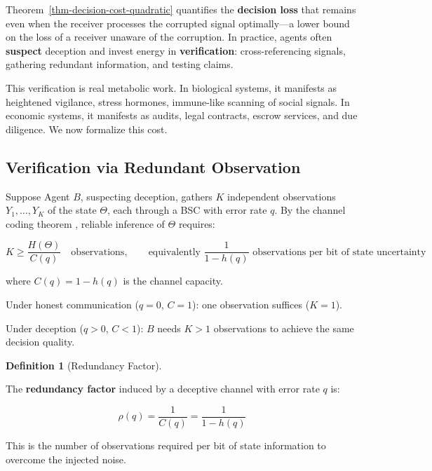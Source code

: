 \documentclass[11pt]{article}
\theoremstyle{plain}
\theoremstyle{definition}
\newtheorem{definition}{Definition}
\theoremstyle{remark}
\let\origsubsection\subsection
\renewcommand{\subsection}{\needspace{7\baselineskip}\origsubsection}
\begin{document}
Theorem~\ref{thm-decision-cost-quadratic} quantifies the
\textbf{decision loss} that remains even when the receiver processes the
corrupted signal optimally---a lower bound on the loss of a receiver
unaware of the corruption. In practice, agents often \textbf{suspect}
deception and invest energy in \textbf{verification}: cross-referencing
signals, gathering redundant information, and testing claims.

This verification is real metabolic work. In biological systems, it
manifests as heightened vigilance, stress hormones, immune-like scanning
of social signals. In economic systems, it manifests as audits, legal
contracts, escrow services, and due diligence. We now formalize this
cost.

\subsection{Verification via Redundant
Observation}\label{verification-via-redundant-observation}

Suppose Agent \(B\), suspecting deception, gathers \(K\) independent
observations \(Y_1, \ldots, Y_K\) of the state \(\Theta\), each through
a BSC with error rate \(q\). By the channel coding theorem
\citep{Shannon1948}, reliable inference of \(\Theta\) requires:

\[K \geq \frac{H(\Theta)}{C(q)} \quad \text{observations}, \qquad \text{equivalently } \frac{1}{1 - h(q)} \text{ observations per bit of state uncertainty}\]

where \(C(q) = 1 - h(q)\) is the channel capacity.

Under honest communication (\(q = 0\), \(C = 1\)): one observation
suffices (\(K = 1\)).

Under deception (\(q > 0\), \(C < 1\)): \(B\) needs \(K > 1\)
observations to achieve the same decision quality.

\begin{definition}[Redundancy Factor]
\label{def-redundancy-factor}

The \textbf{redundancy factor} induced by a deceptive channel with error rate $q$ is:

$$\rho(q) = \frac{1}{C(q)} = \frac{1}{1 - h(q)}$$

This is the number of observations required per bit of state information to overcome the injected noise.
\end{definition}
\end{document}
